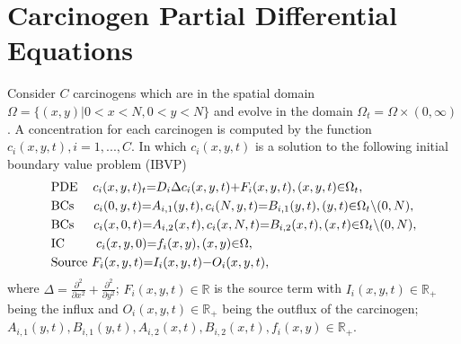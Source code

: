 \documentclass[\main/thesis.tex]{subfiles}
\begin{document}
\section{Carcinogen Partial Differential Equations}
Consider $C$ carcinogens which are in the spatial domain \newline
$\Omega {=} \{ (x, y) | 0 {<} x {<} N, 0 {<} y {<} N \}$ and evolve in the domain $\Omega_t {=} \Omega {\times} (0, \infty)$.\newline
A concentration for each carcinogen is computed by the function \newline
$c_i(x, y, t), i=1, ..., C$. In which $c_i(x, y, t)$ is a solution to the following initial boundary value problem (IBVP)
\begin{align}
&\text{PDE } \hspace{0.12in}c_i(x, y, t)_t {=} D_i\Delta c_i(x, y, t) {+} F_i(x, y, t), (x, y, t) {\in} \Omega_t,
\label{eq:carcin_pde_inhomo} \\
&\text{BCs } \hspace{0.17in}c_i(0, y, t) {=} A_{i, 1}(y, t), c_i(N, y, t) {=} B_{i, 1}(y, t), (y, t) {\in} \Omega_t {\setminus} (0, N),
\label{eq:bcs_inhomo_x} \\
&\text{BCs } \hspace{0.17in}c_i(x, 0, t) {=} A_{i, 2}(x, t), c_i(x, N, t) {=} B_{i, 2}(x, t), (x, t) {\in} \Omega_t {\setminus} (0, N),
\label{eq:bcs_inhomo_y} \\
&\text{IC } \hspace{0.3in}c_i(x, y, 0) {=} f_i(x, y), (x, y) {\in} \Omega,
\label{eq:ic_inhomo} \\
&\text{Source } F_i(x, y, t) {=} I_i(x, y, t) {-} O_i(x, y, t),
\label{eq:source_term}
\end{align}
where $\Delta {=} \frac{\partial^2}{\partial x^2}{+}\frac{\partial^2}{\partial y^2}$; $F_i(x, y, t) {\in} \mathbb{R}$ is the source term with $I_i(x, y, t) {\in} \mathbb{R}_+$ being the influx and 
$O_i(x, y, t) {\in} \mathbb{R}_+$ being the outflux of the carcinogen; \newline
$A_{i, 1}(y, t), B_{i, 1}(y, t), A_{i, 2}(x, t), B_{i, 2}(x, t), f_i(x, y) {\in} \mathbb{R}_+$.  
\end{document}
